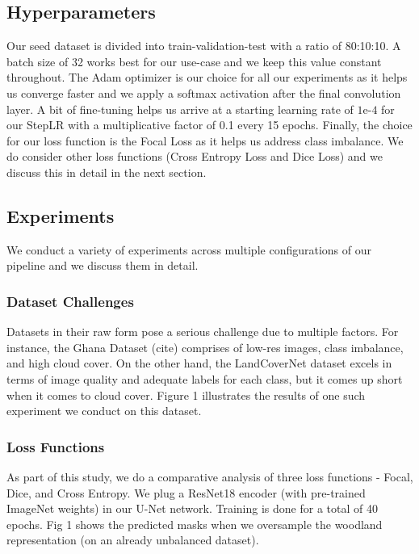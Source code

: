 \documentclass[conference]{IEEEtran}
\begin{document}
\subsection{Hyperparameters}
Our seed dataset is divided into train-validation-test with a ratio of 80:10:10. A batch size of 32 works best for our use-case and we keep this value constant throughout. The Adam optimizer is our choice for all our experiments as it helps us converge faster and we apply a softmax activation after the final convolution layer. A bit of fine-tuning helps us arrive at a starting learning rate of $1\text{e-}4$ for our StepLR with a multiplicative factor of 0.1 every 15 epochs. Finally, the choice for our loss function is the Focal Loss as it helps us address class imbalance. We do consider other loss functions (Cross Entropy Loss and Dice Loss) and we discuss this in detail in the next section.
\subsection{Experiments}
We conduct a variety of experiments across multiple configurations of our pipeline and we discuss them in detail.

\subsubsection{Dataset Challenges}
Datasets in their raw form pose a serious challenge due to multiple factors. For instance, the Ghana Dataset (cite) comprises of low-res images, class imbalance, and high cloud cover. On the other hand, the LandCoverNet dataset excels in terms of image quality and adequate labels for each class, but it comes up short when it comes to cloud cover. Figure 1 illustrates the results of one such experiment we conduct on this dataset.

\subsubsection{Loss Functions} As part of this study, we do a comparative analysis of three loss functions - Focal, Dice, and Cross Entropy. We plug a ResNet18 encoder (with pre-trained ImageNet weights) in our U-Net network. Training is done for a total of 40 epochs. Fig 1 shows the predicted masks when we oversample the woodland representation (on an already unbalanced dataset).
\end{document}

